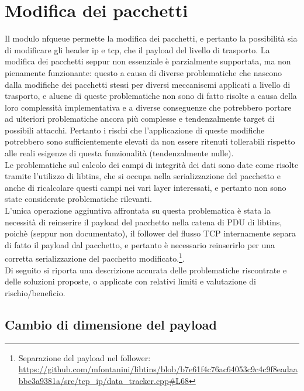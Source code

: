 \section{Modifica dei pacchetti}

Il modulo nfqueue permette la modifica dei pacchetti, e pertanto la possibilità sia di modificare gli header ip e tcp, che il payload del livello di trasporto.
La modifica dei pacchetti seppur non essenziale è parzialmente supportata, ma non pienamente funzionante: questo a causa di diverse problematiche che nascono
dalla modifiche dei pacchetti stessi per diversi meccaniscmi applicati a livello di trasporto, e alucne di queste problematiche non sono di fatto
risolte a causa della loro complessità implementativa e a diverse conseguenze che potrebbero portare ad ulteriori problematiche ancora più complesse e tendenzalmente target di possibili attacchi.
Pertanto i rischi che l'applicazione di queste modifiche potrebbero sono sufficientemente elevati da non essere ritenuti tollerabili rispetto alle reali esigenze di questa funzionalità (tendenzalmente nulle).\\

Le problematiche sul calcolo dei campi di integrità dei dati sono date come risolte tramite l'utilizzo di libtins, che si occupa nella serializzazione del pacchetto e
anche di ricalcolare questi campi nei vari layer interessati, e pertanto non sono state considerate problematiche rilevanti.\\

L'unica operazione aggiuntiva affrontata su questa problematica è stata la necessità di reinserire il payload del pacchetto nella catena di PDU di libtins,
poichè (seppur non documentato), il follower del flusso TCP internamente separa di fatto il payload dal pacchetto, e pertanto è necessario reinserirlo per una
corretta serializzazione del pacchetto modificato.\footnote{Separazione del payload nel follower: \url{https://github.com/mfontanini/libtins/blob/b7e61f4c76ac64053c9c4c9f8eadaabbe3a9381a/src/tcp_ip/data_tracker.cpp\#L68}}.\\

Di seguito si riporta una descrizione accurata delle problematiche riscontrate e delle soluzioni proposte, o applicate con relativi limiti e valutazione di rischio/beneficio.\\

\subsection{Cambio di dimensione del payload}

